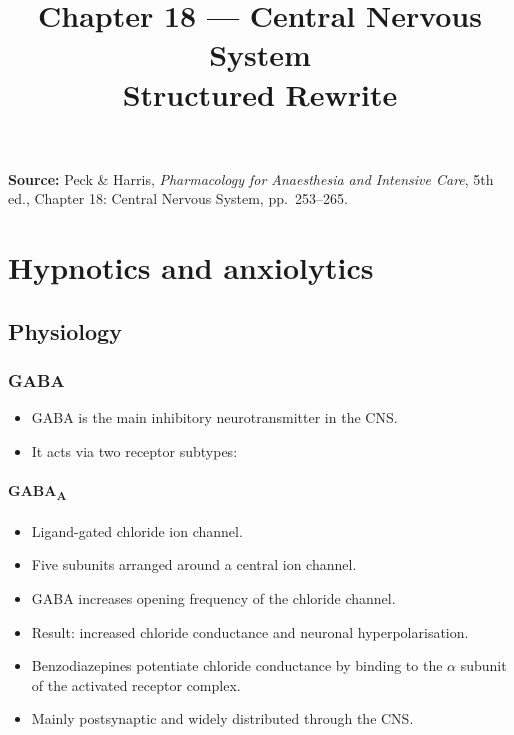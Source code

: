 \documentclass[11pt,a4paper]{article}
\title{Chapter 18 --- Central Nervous System\\Structured Rewrite}
\author{}
\date{}
\begin{document}
\maketitle

\noindent\textbf{Source:} Peck \& Harris, \textit{Pharmacology for Anaesthesia and Intensive Care}, 5th ed., Chapter 18: Central Nervous System, pp.\ 253--265.

\tableofcontents

\newpage

\section{Hypnotics and anxiolytics}

\subsection{Physiology}

\subsubsection{GABA}
\begin{itemize}
  \item GABA is the main inhibitory neurotransmitter in the CNS.
  \item It acts via two receptor subtypes:
\end{itemize}

\paragraph{GABA\textsubscript{A}}
\begin{itemize}
  \item Ligand-gated chloride ion channel.
  \item Five subunits arranged around a central ion channel.
  \item GABA increases opening frequency of the chloride channel.
  \item Result: increased chloride conductance and neuronal hyperpolarisation.
  \item Benzodiazepines potentiate chloride conductance by binding to the $\alpha$ subunit of the activated receptor complex.
  \item Mainly postsynaptic and widely distributed through the CNS.
\end{itemize}
\end{document}
